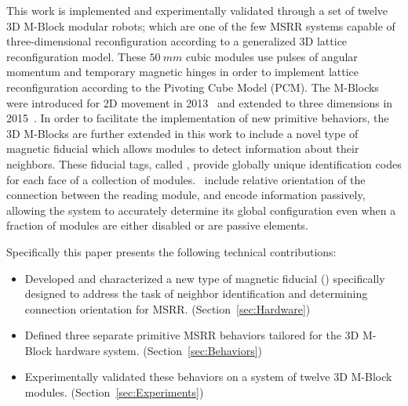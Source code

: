 This work is implemented and experimentally validated through a set of twelve 3D M-Block modular robots; which are one of the few MSRR systems capable of three-dimensional reconfiguration according to a generalized 3D lattice reconfiguration model. These $50~mm$ cubic modules use pulses of angular momentum and temporary magnetic hinges in order to implement lattice reconfiguration according to the Pivoting Cube Model (PCM). The M-Blocks were introduced for 2D movement in 2013~\cite{RomanishinRus-IROS13} and extended to three dimensions in 2015~\cite{Romanishin20153d}. In order to facilitate the implementation of new primitive behaviors, the 3D M-Blocks are further extended in this work to include a novel type of magnetic fiducial which allows modules to detect information about their neighbors. These fiducial tags, called \tagNamePlural, provide globally unique identification codes for each face of a collection of modules. \TagNamePlural~include relative orientation of the connection between the reading module, and encode information passively, allowing the system to accurately determine its global configuration even when a fraction of modules are either disabled or are passive elements.

Specifically this paper presents the following technical contributions:
\begin{itemize}
	\item Developed and characterized a new type of magnetic fiducial (\TagNamePlural) specifically designed to address the task of neighbor identification and determining connection orientation for MSRR. (Section~\ref{sec:Hardware})
	\item Defined three separate primitive MSRR behaviors tailored for the 3D M-Block hardware system. (Section~\ref{sec:Behaviors})
	\item Experimentally validated these behaviors on a system of twelve 3D M-Block modules. (Section~\ref{sec:Experiments})
\end{itemize}



